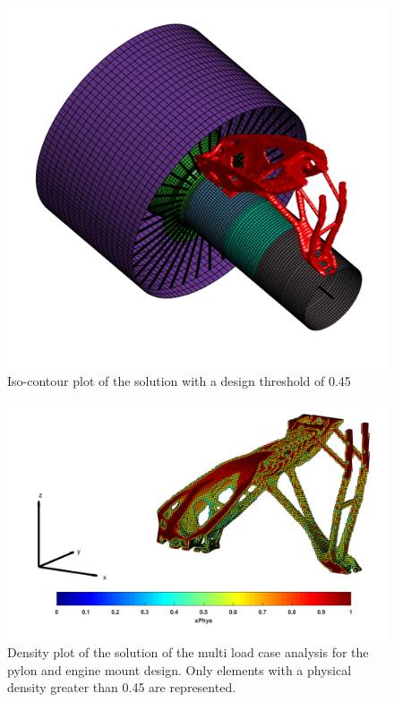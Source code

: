    \begin{figure}[ht]
    \centering
    \includegraphics[width=\textwidth]{images/Ch2/MLCS_solution}
    \caption{Iso-contour plot of the solution with a design threshold of 0.45}
    \label{fig.2.25}
    \end{figure}
       \begin{figure}[ht]
        \centering
        \includegraphics[width=\textwidth]{images/Ch2/Density_plot_000}
        \caption{Density plot of the solution of the multi load case analysis for the pylon and engine mount design. Only elements with a physical density greater than 0.45 are represented.}
        \label{fig.2.27}
        \end{figure}
